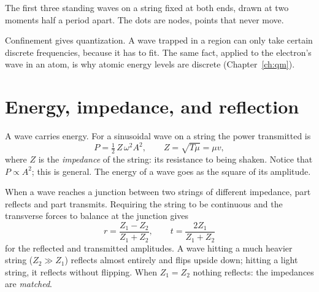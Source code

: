 \begin{center}
\begin{minipage}{\linewidth}\centering
{}

{\small The first three standing waves on a string fixed at both ends, drawn at two moments half a period apart. The dots are nodes, points that never move.}
\end{minipage}
\end{center}

\begin{keyidea}
Confinement gives quantization. A wave trapped in a region can only take certain discrete frequencies, because it has to fit. The same fact, applied to the electron's wave in an atom, is why atomic energy levels are discrete (Chapter~\ref{ch:qm}).
\end{keyidea}

\section{Energy, impedance, and reflection}

A wave carries energy. For a sinusoidal wave on a string the power transmitted is
\[
  P = \tfrac12\,Z\,\omega^2 A^2, \qquad Z = \sqrt{T\mu} = \mu v,
\]
where $Z$ is the \emph{impedance} of the string: its resistance to being shaken. Notice that $P\propto A^2$; this is general. The energy of a wave goes as the square of its amplitude.

When a wave reaches a junction between two strings of different impedance, part reflects and part transmits. Requiring the string to be continuous and the transverse forces to balance at the junction gives
\[
  r = \frac{Z_1 - Z_2}{Z_1 + Z_2}, \qquad t = \frac{2Z_1}{Z_1+Z_2}
\]
for the reflected and transmitted amplitudes. A wave hitting a much heavier string ($Z_2\gg Z_1$) reflects almost entirely and flips upside down; hitting a light string, it reflects without flipping. When $Z_1 = Z_2$ nothing reflects: the impedances are \emph{matched}.

